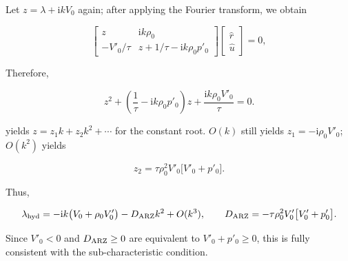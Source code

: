 \documentclass[11pt,a4paper,openany]{book}
\numberwithin{equation}{chapter}
\numberwithin{figure}{chapter}
\numberwithin{table}{chapter}
\begin{document}
Let $z=\lambda+\mathrm{i}kV_0$ again; after applying the Fourier transform, we obtain

\begin{equation}
\begin{bmatrix}
z&\mathrm{i}k\rho_0\\[2pt]
-V'_0/\tau&z+1/\tau-\mathrm{i}k\rho_0p'_0
\end{bmatrix}
\begin{bmatrix}\hat r\\ \hat u\end{bmatrix} = 0,
\end{equation}


Therefore,

\begin{equation}
z^2+\left(\frac1\tau-\mathrm{i}k\rho_0p'_0\right)z
+\frac{\mathrm{i}k\rho_0V'_0}{\tau}=0.
\label{eq:arz-dispersion}
\end{equation}

yields $z=z_1k+z_2k^2+\cdots$ for the constant root. $O(k)$ still yields $z_1=-\mathrm{i}\rho_0V'_0$; $O(k^2)$ yields

\begin{equation}
z_2=\tau\rho_0^2V'_0\bigl[V'_0+p'_0\bigr].
\end{equation}

Thus,

\begin{equation}
\lambda_{\rm hyd}
=-\mathrm{i}k\bigl(V_0+\rho_0V'_0\bigr)
-D_{\rm ARZ}k^2+O(k^3),
\qquad
D_{\rm ARZ}
=-\tau\rho_0^2V'_0\bigl[V'_0+p'_0\bigr].
\label{eq:arz-effective-diffusion}
\end{equation}

Since $V'_0<0$ and $D_{\rm ARZ}\ge0$ are equivalent to $V'_0+p'_0\ge0$, this is fully consistent with the sub-characteristic condition.
\end{document}
